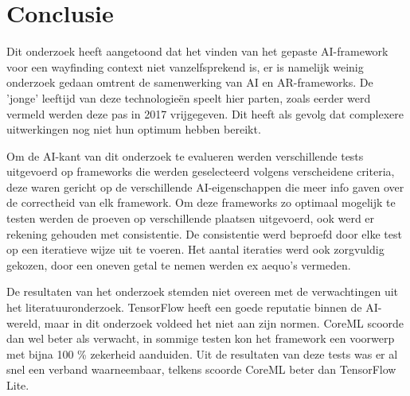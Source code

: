 
\chapter{Conclusie}
\label{ch:conclusie}


Dit onderzoek heeft aangetoond dat het vinden van het gepaste AI-framework voor een wayfinding context niet vanzelfsprekend is, er is namelijk weinig onderzoek gedaan omtrent de samenwerking van AI en AR-frameworks. De 'jonge' leeftijd van deze technologieën speelt hier parten, zoals eerder werd vermeld werden deze pas in 2017 vrijgegeven. Dit heeft als gevolg dat complexere uitwerkingen nog niet hun optimum hebben bereikt.

Om de AI-kant van dit onderzoek te evalueren werden verschillende tests uitgevoerd op frameworks die werden geselecteerd volgens verscheidene criteria, deze waren gericht op de verschillende AI-eigenschappen die meer info gaven over de correctheid van elk framework. Om deze frameworks zo optimaal mogelijk te testen werden de proeven op verschillende plaatsen uitgevoerd, ook werd er rekening gehouden met consistentie. De consistentie werd beproefd door elke  test op een iteratieve wijze uit te voeren. Het aantal iteraties werd ook zorgvuldig gekozen, door een oneven getal te nemen werden ex aequo's vermeden.

De resultaten van het onderzoek stemden niet overeen met de verwachtingen uit het literatuuronderzoek. TensorFlow heeft een goede reputatie binnen de AI-wereld, maar in dit onderzoek voldeed het niet aan zijn normen. CoreML scoorde dan wel beter als verwacht, in sommige testen kon het framework een voorwerp met bijna 100 \% zekerheid aanduiden. 
Uit de resultaten van deze tests was er al snel een verband waarneembaar, telkens scoorde CoreML beter dan TensorFlow Lite. 

